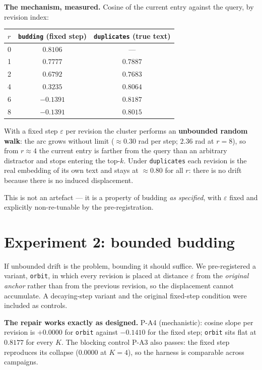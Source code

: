 \documentclass[11pt,a4paper]{article}
\begin{document}
\textbf{The mechanism, measured.} Cosine of the current entry against the query, by revision index:

\begin{center}
\begin{tabular}{lcc}
\toprule
$r$ & \texttt{budding} (fixed step) & \texttt{duplicates} (true text) \\
\midrule
0 & $0.8106$ & --- \\
1 & $0.7777$ & $0.7887$ \\
2 & $0.6792$ & $0.7683$ \\
4 & $\mathbf{0.3235}$ & $0.8064$ \\
6 & $\mathbf{-0.1391}$ & $0.8187$ \\
8 & $\mathbf{-0.1391}$ & $0.8015$ \\
\bottomrule
\end{tabular}
\end{center}

With a fixed step $\varepsilon$ per revision the cluster performs an \textbf{unbounded random walk}:
the arc grows without limit ($\approx 0.30$ rad per step; $2.36$ rad at $r=8$), so from $r \approx 4$
the current entry is farther from the query than an arbitrary distractor and stops entering the
top-$k$. Under \texttt{duplicates} each revision is the real embedding of its own text and stays at
$\approx 0.80$ for all $r$: there is no drift because there is no induced displacement.

This is not an artefact --- it is a property of budding \emph{as specified}, with $\varepsilon$ fixed
and explicitly non-re-tunable by the pre-registration.

\section{Experiment 2: bounded budding}
\label{sec:e2}

If unbounded drift is the problem, bounding it should suffice. We pre-registered a variant,
\texttt{orbit}, in which every revision is placed at distance $\varepsilon$ from the
\emph{original anchor} rather than from the previous revision, so the displacement cannot accumulate.
A decaying-step variant and the original fixed-step condition were included as controls.

\textbf{The repair works exactly as designed.} P-A4 (mechanistic): cosine slope per revision is
$+0.0000$ for \texttt{orbit} against $-0.1410$ for the fixed step; \texttt{orbit} sits flat at
$0.8177$ for every $K$. The blocking control P-A3 also passes: the fixed step reproduces its collapse
($0.0000$ at $K=4$), so the harness is comparable across campaigns.
\end{document}
